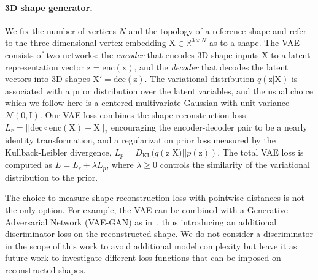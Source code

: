 \documentclass[10pt,twocolumn,letterpaper]{article}
\newcommand{\bb}[1]{\bm{\mathrm{#1}}}
\begin{document}
\paragraph{3D shape generator.}
We fix the number of vertices $N$ and the topology of a reference shape and refer to the three-dimensional vertex embedding $\bb{X}  \in \mathbb{R}^{3 \times N}$ as to a shape.
The VAE consists of two networks: the \emph{encoder} that encodes 3D shape inputs $\bb{X}$ to a latent representation vector $\bb{z}=\mathrm{enc}(\bb{x})$, and the \emph{decoder} that decodes the latent vectors into 3D shapes $\bb{X}'=\mathrm{dec}(\bb{z})$. The variational distribution $q(\bb{z}|\bb{X})$ is associated with a prior distribution over the latent variables, and the usual choice which we follow here is a centered multivariate Gaussian with unit variance $\mathcal{N}(\bb{0},\bb{I})$. Our VAE loss combines the shape reconstruction loss $L_r = ||\mathrm{dec}\circ \mathrm{enc} (\bb{X})-\bb{X}||_2$ encouraging the encoder-decoder pair to be a nearly identity transformation, and a regularization prior loss measured by the Kullback-Leibler divergence, $L_p=D_\mathrm{KL}(q(\bb{z}|\bb{X})||p(\bb{z}))$. The total VAE loss is computed as $L=L_r + \lambda L_p$, where $\lambda \geq 0$ controls the similarity of the variational distribution to the prior.

The choice to measure shape reconstruction loss with pointwise distances is not the only option. For example, the VAE can be combined with a Generative Adversarial Network (VAE-GAN) as in~\cite{larsen16icml,wu16nips}, thus introducing an additional discriminator loss on the reconstructed shape. We do not consider a discriminator in the scope of this work to avoid additional model complexity but leave it as future work to investigate different loss functions that can be imposed on reconstructed shapes.
\end{document}
